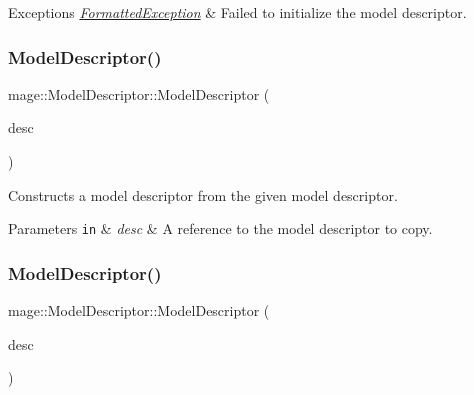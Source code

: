 \begin{DoxyExceptions}{Exceptions}
{\em \hyperlink{classmage_1_1_formatted_exception}{Formatted\+Exception}} & Failed to initialize the model descriptor. \\
\hline
\end{DoxyExceptions}
\hypertarget{classmage_1_1_model_descriptor_af44185efc20e10ede762d29bc454c5f3}{}\label{classmage_1_1_model_descriptor_af44185efc20e10ede762d29bc454c5f3} 
\subsubsection{\texorpdfstring{Model\+Descriptor()}{ModelDescriptor()}\hspace{0.1cm}{\footnotesize\ttfamily [3/4]}}
{\footnotesize\ttfamily mage\+::\+Model\+Descriptor\+::\+Model\+Descriptor (\begin{DoxyParamCaption}\item[{const \hyperlink{classmage_1_1_model_descriptor}{Model\+Descriptor} \&}]{desc }\end{DoxyParamCaption})\hspace{0.3cm}{\ttfamily [delete]}}

Constructs a model descriptor from the given model descriptor.


\begin{DoxyParams}[1]{Parameters}
\mbox{\tt in}  & {\em desc} & A reference to the model descriptor to copy. \\
\hline
\end{DoxyParams}
\hypertarget{classmage_1_1_model_descriptor_af5ece586e2a8404cc29e703885531e72}{}\label{classmage_1_1_model_descriptor_af5ece586e2a8404cc29e703885531e72} 
\subsubsection{\texorpdfstring{Model\+Descriptor()}{ModelDescriptor()}\hspace{0.1cm}{\footnotesize\ttfamily [4/4]}}
{\footnotesize\ttfamily mage\+::\+Model\+Descriptor\+::\+Model\+Descriptor (\begin{DoxyParamCaption}\item[{\hyperlink{classmage_1_1_model_descriptor}{Model\+Descriptor} \&\&}]{desc }\end{DoxyParamCaption})\hspace{0.3cm}{\ttfamily [default]}}

